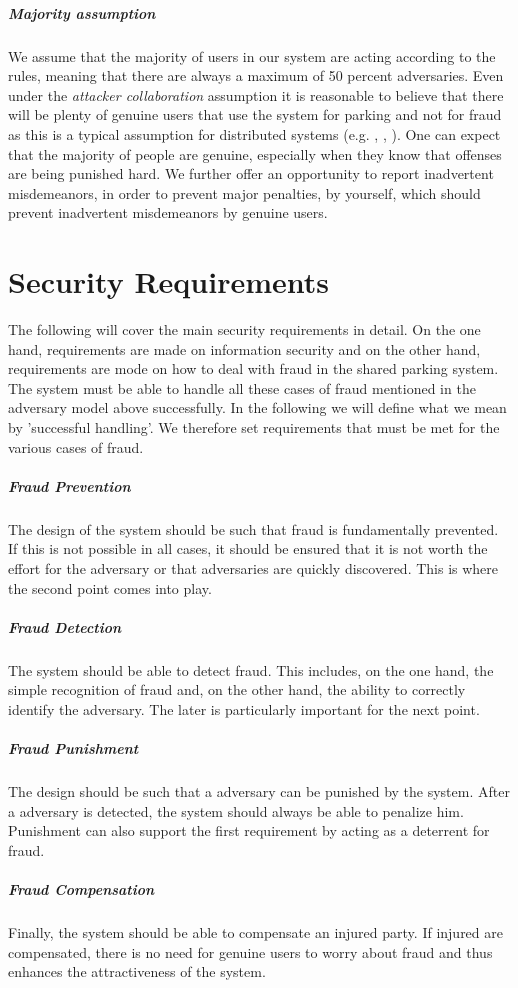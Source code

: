\subparagraph{Majority assumption} We assume that the majority of users in our system are acting according to the rules, meaning that there are always a maximum of 50 percent adversaries. Even under the \textit{attacker collaboration} assumption it is reasonable to believe that there will be plenty of genuine users that use the system for parking and not for fraud as this is a typical assumption for distributed systems (e.g. \cite{benenson2004secure}, \cite{nojoumian2014efficient}, \cite{avoine2005gracefully}). One can expect that the majority of people are genuine, especially when they know that offenses are being punished hard. We further offer an opportunity to report inadvertent misdemeanors, in order to prevent major penalties, by yourself, which should prevent inadvertent misdemeanors by genuine users.\\

\section{Security Requirements}
The following will cover the main security requirements in detail. On the one hand, requirements are made on information security and on the other hand, requirements are mode on how to deal with fraud in the shared parking system. \\

The system must be able to handle all these cases of fraud mentioned in the adversary model above successfully. In the following we will define what we mean by 'successful handling'. We therefore set requirements that must be met for the various cases of fraud.
\subparagraph{Fraud Prevention} The design of the system should be such that fraud is fundamentally prevented. If this is not possible in all cases, it should be ensured that it is not worth the effort for the adversary or that adversaries are quickly discovered. This is where the second point comes into play.
\subparagraph{Fraud Detection} The system should be able to detect fraud. This includes, on the one hand, the simple recognition of fraud and, on the other hand, the ability to correctly identify the adversary. The later is particularly important for the next point.
\subparagraph{Fraud Punishment} The design should be such that a adversary can be punished by the system. After a adversary is detected, the system should always be able to penalize him. Punishment can also support the first requirement by acting as a deterrent for fraud.
\subparagraph{Fraud Compensation} Finally, the system should be able to compensate an injured party. If injured are compensated, there is no need for genuine users to worry about fraud and thus enhances the attractiveness of the system.\\


